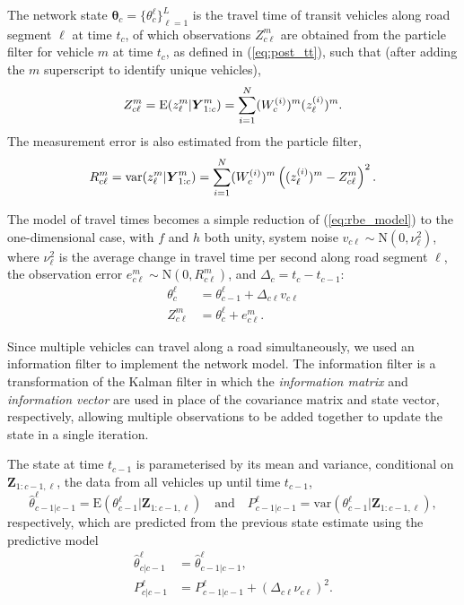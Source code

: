 \documentclass[times, doublespace]{anzsauth}
\begin{document}
The network state $\boldsymbol\theta_c = \{\theta_c^\ell\}_{\ell = 1}^L$ is the travel time
of transit vehicles along road segment $\ell$ at time $t_c$,
of which observations $Z_{c\ell}^{m}$
are obtained from the particle filter for vehicle $m$ at time $t_c$,
as defined in (\ref{eq:post_tt}), such that
(after adding the $m$ superscript to identify unique vehicles),
\begin{equation}
\label{eq:tt_obs_mean}
Z_{c\ell}^{m} = \mathrm{E}(z_{\ell}^{m} | \mbox{$\boldsymbol{Y}$}^m_{1:c}) =
\sum_{i=1}^N (W_c^{(i)})^m (z_\ell^{(i)})^{m}.
\end{equation}
The measurement error is also estimated from the particle filter,
\begin{equation}
\label{eq:tt_obs_err}
R_{c\ell}^m = \mathrm{var}(z_{\ell}^{m} | \mbox{$\boldsymbol{Y}$}^m_{1:c}) =
\sum_{i=1}^N (W_c^{(i)})^m \left((z_\ell^{(i)})^{m} - Z_{c\ell}^{m}\right)^2.
\end{equation}

The model of travel times becomes a simple reduction of (\ref{eq:rbe_model})
to the one-dimensional case,
with $f$ and $h$ both unity,
system noise $v_{c\ell} \sim \mathrm{N}(0, \nu_\ell^2)$,
where $\nu_\ell^2$ is the average change in travel time per second
along road segment $\ell$,
the observation error $e_{c\ell}^{m} \sim \mathrm{N}(0, R_{c\ell}^{m})$,
and $\Delta_c = t_c - t_{c-1}$:
\begin{equation*}
\begin{split}
\theta_c^\ell &= \theta_{c-1}^\ell + \Delta_{c\ell} v_{c\ell} \\
Z_{c\ell}^{m} &= \theta_c^\ell + e_{c\ell}^{m}.
\end{split}
\end{equation*}


Since multiple vehicles can travel along a road simultaneously,
we used an information filter to implement the network model.
The information filter is a transformation of the Kalman filter in which the
\emph{information matrix} and \emph{information vector} are used in place of
the covariance matrix and state vector, respectively,
allowing multiple observations to be added together to update the state
in a single iteration.


The state at time $t_{c-1}$ is parameterised by its mean and variance,
conditional on $\boldsymbol{Z}_{1:c-1,\ell}$,
the data from all vehicles up until time $t_{c-1}$,
\begin{equation*}
\hat \theta_{c-1|c-1}^\ell =
\mathrm{E}(\theta_{c-1}^\ell | \boldsymbol{Z}_{1:c-1,\ell})
\quad\text{and}\quad
P_{c-1|c-1}^\ell =
\mathrm{var}(\theta_{c-1}^\ell | \boldsymbol{Z}_{1:c-1,\ell}),
\end{equation*}
respectively,
which are predicted from the previous state estimate using the predictive model
\begin{align*}
\label{eq:kf_transition}
\hat \theta^\ell_{c|c-1} &= \hat \theta^\ell_{c-1|c-1}, \\
P^\ell_{c|c-1} &= P^\ell_{c-1|c-1} + (\Delta_{c\ell} \nu_{c\ell})^2.
\end{align*}
\end{document}
